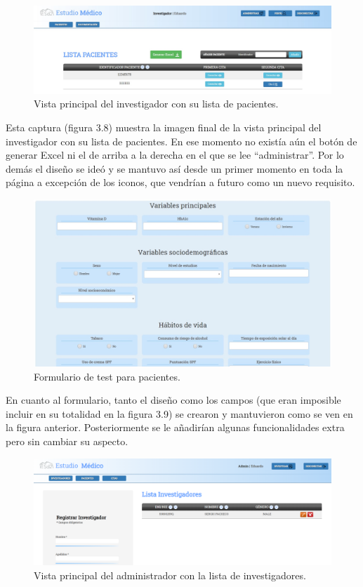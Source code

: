  \begin{figure}[h]
    \centering
     \includegraphics[width=1\textwidth]{images/investigadorPacientes.jpg}
    \caption{Vista principal del investigador con su lista de pacientes.}
\end{figure}

Esta captura (figura 3.8) muestra la imagen final de la vista principal del investigador con su lista de pacientes. En ese momento no existía aún el botón de generar Excel ni el de arriba a la derecha en el que se lee ``administrar''. Por lo demás el diseño se ideó y se mantuvo así desde un primer momento en toda la página a excepción de los iconos, que vendrían a futuro como un nuevo requisito.

\begin{figure}[h]
    \centering
     \includegraphics[width=1\textwidth]{images/testPacientes.jpg}
    \caption{Formulario de test para pacientes.}
\end{figure}

En cuanto al formulario, tanto el diseño como los campos (que eran imposible incluir en su totalidad en la figura 3.9) se crearon y mantuvieron como se ven en la figura anterior. Posteriormente se le añadirían algunas funcionalidades extra pero sin cambiar su aspecto.
\newpage

\begin{figure}[h]
    \centering
     \includegraphics[width=1\textwidth]{images/adminInvestigadores.png}
    \caption{Vista principal del administrador con la lista de investigadores.}
\end{figure}

